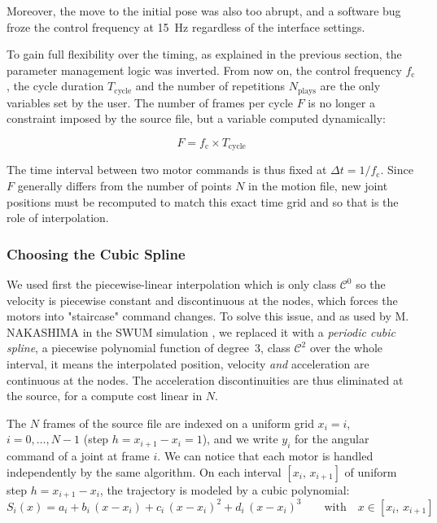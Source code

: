 \documentclass{tropLaClasse}
\begin{document}
Moreover, the move to the initial pose was also too abrupt, and a software bug froze the control frequency at 15~Hz regardless of the interface settings.

To gain full flexibility over the timing, as explained in the previous section, the parameter management logic was inverted. From now on, the control frequency $f_{\mathrm{c}}$, the cycle duration $T_{\mathrm{cycle}}$ and the number of repetitions $N_{\mathrm{plays}}$ are the only variables set by the user. The number of frames per cycle $F$ is no longer a constraint imposed by the source file, but a variable computed dynamically:

\begin{equation}
    F = f_{\mathrm{c}} \times T_{\mathrm{cycle}}
\end{equation}

The time interval between two motor commands is thus fixed at $\Delta t = 1/f_{\mathrm{c}}$. Since $F$ generally differs from the number of points $N$ in the motion file, new joint positions must be recomputed to match this exact time grid and so that is the role of interpolation.

\subsubsection{Choosing the Cubic Spline}

We used first the piecewise-linear interpolation which is only class $\mathcal{C}^0$ so the velocity is piecewise constant and discontinuous at the nodes, which forces the motors into "staircase" command changes. To solve this issue, and as used by M. NAKASHIMA in the SWUM simulation \cite{nakashima2012optimizing}, we replaced it with a \textit{periodic cubic spline}, a piecewise polynomial function of degree~3, class $\mathcal{C}^2$ over the whole interval, it means the interpolated position, velocity \emph{and} acceleration are continuous at the nodes. The acceleration discontinuities are thus eliminated at the source, for a compute cost linear in $N$.

The $N$ frames of the source file are indexed on a uniform grid $x_i = i$, $i = 0,\dots,N-1$ (step $h = x_{i+1} - x_i = 1$), and we write $y_i$ for the angular command of a joint at frame $i$. We can notice that each motor is handled independently by the same algorithm. On each interval $[x_i,\, x_{i+1}]$ of uniform step $h = x_{i+1} - x_i$, the trajectory is modeled by a cubic polynomial:
\begin{equation}
    S_i(x) = a_i + b_i\,(x - x_i) + c_i\,(x - x_i)^2 + d_i\,(x - x_i)^3
    \qquad \text{with} \quad x \in [x_i,\, x_{i+1}]
    \label{eq:spline-cubique}
\end{equation}
\end{document}
